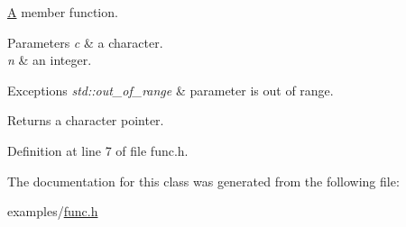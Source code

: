 \mbox{\hyperlink{class_a}{A}} member function. 


\begin{DoxyParams}{Parameters}
{\em c} & a character. \\
\hline
{\em n} & an integer. \\
\hline
\end{DoxyParams}

\begin{DoxyExceptions}{Exceptions}
{\em std\+::out\+\_\+of\+\_\+range} & parameter is out of range. \\
\hline
\end{DoxyExceptions}
\begin{DoxyReturn}{Returns}
a character pointer. 
\end{DoxyReturn}


Definition at line 7 of file func.\+h.


\begin{DoxyCode}{0}

\end{DoxyCode}


The documentation for this class was generated from the following file\+:\begin{DoxyCompactItemize}
\item 
examples/\mbox{\hyperlink{func_8h}{func.\+h}}\end{DoxyCompactItemize}
